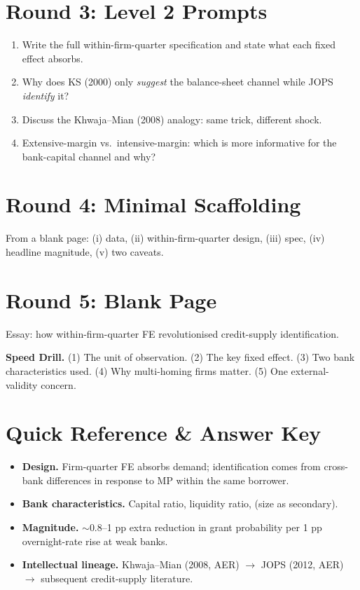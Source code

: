 \documentclass[11pt]{article}
\begin{document}
\section*{Round 3: Level 2 Prompts}
\begin{enumerate}
\item Write the full within-firm-quarter specification and state what each fixed effect absorbs.
\item Why does KS (2000) only \emph{suggest} the balance-sheet channel while JOPS \emph{identify} it?
\item Discuss the Khwaja--Mian (2008) analogy: same trick, different shock.
\item Extensive-margin vs.\ intensive-margin: which is more informative for the bank-capital channel and why?
\end{enumerate}

\section*{Round 4: Minimal Scaffolding}
From a blank page: (i) data, (ii) within-firm-quarter design, (iii) spec, (iv) headline magnitude, (v) two caveats.

\section*{Round 5: Blank Page}
Essay: how within-firm-quarter FE revolutionised credit-supply identification.

\vspace{6pt}
\begin{drillbox}
\textbf{Speed Drill.} (1) The unit of observation. (2) The key fixed effect. (3) Two bank characteristics used. (4) Why multi-homing firms matter. (5) One external-validity concern.
\end{drillbox}

\section*{Quick Reference \& Answer Key}
\begin{answerbox}
\begin{itemize}
\item \textbf{Design.} Firm-quarter FE absorbs demand; identification comes from cross-bank differences in response to MP within the same borrower.
\item \textbf{Bank characteristics.} Capital ratio, liquidity ratio, (size as secondary).
\item \textbf{Magnitude.} $\sim$0.8--1 pp extra reduction in grant probability per 1 pp overnight-rate rise at weak banks.
\item \textbf{Intellectual lineage.} Khwaja--Mian (2008, AER) $\to$ JOPS (2012, AER) $\to$ subsequent credit-supply literature.
\end{itemize}
\end{answerbox}
\end{document}
